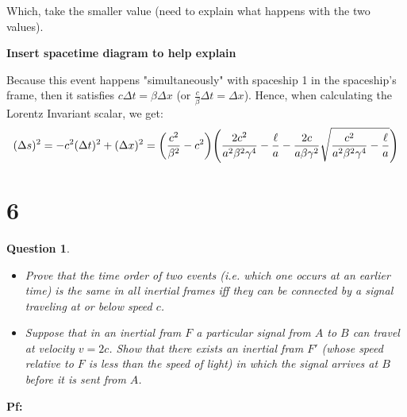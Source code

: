 \documentclass{article}
\newtheorem{question}{Question}
\DeclarePairedDelimiter{\paran}{(}{)}%
\begin{document}
Which, take the smaller value (need to explain what happens with the two values).

\textbf{Insert spacetime diagram to help explain}

Because this event happens "simultaneously" with spaceship 1 in the spaceship's frame, then it satisfies $c\Delta t = \beta \Delta x$ (or $\frac{c}{\beta}\Delta t=\Delta x$). Hence, when calculating the Lorentz Invariant scalar, we get:
\begin{align}
    (\Delta s)^2 = -c^2(\Delta t)^2+(\Delta x)^2 = \paran*{\frac{c^2}{\beta^2}-c^2}\paran*{\frac{2c^2}{a^2\beta^2\gamma^4}-\frac{\ell}{a}-\frac{2c}{a\beta\gamma^2}\sqrt{\frac{c^2}{a^2\beta^2\gamma^4}-\frac{\ell}{a}}}
\end{align}

\break

\section*{6}
\begin{question}\label{q6}

    \hfil

    \begin{itemize}
        \item[(a)] Prove that the time order of two events (i.e. which one occurs at an earlier time) is the same in all inertial frames iff they can be connected by a signal traveling at or below speed $c$.
        \item[(b)] Suppose that in an inertial fram $F$ a particular signal from $A$ to $B$ can travel at velocity $v=2c$. Show that there exists an inertial fram $F'$ (whose speed relative to $F$ is less than the speed of light) in which the signal arrives at $B$ before it is sent from $A$.
    \end{itemize}
\end{question}

\textbf{Pf:}
\end{document}
